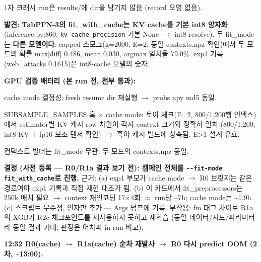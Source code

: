\par\noindent \textbullet\enspace 1차 크래시 run은 results/\allowbreak{}에 dir을 남기지 않음 (record 오염 없음).


\textbf{발견: TabPFN-3의 fit\_\allowbreak{}with\_\allowbreak{}cache는 KV cache를 기본 int8 양자화} (inference.py:860, \texttt{kv\_\allowbreak{}\allowbreak{}cache\allowbreak{}\_\allowbreak{}\allowbreak{}precisi\allowbreak{}on} 기본 None  \ensuremath{\rightarrow}  int8 resolve). 두 fit\_\allowbreak{}mode는 \textbf{다른 모델이다}: capped 스모크(k=\allowbreak{}2000, E=\allowbreak{}2, 동일 contexts.npz 확인)에서 두 모드의 확률 max|diff| 0.486, mean 0.030, argmax 일치율 79.0\%. exp1 기록(web\_\allowbreak{}attacks 0.1615)은 int8-cache 모델의 숫자.

\textbf{GPU 검증 배터리 (본 run 전, 전부 통과):}

\par\noindent \textbullet\enspace cache mode 결정성: fresh resume dir 재실행  \ensuremath{\rightarrow}  probs npy md5 동일.


\par\noindent \textbullet\enspace SUBSAMPLE\_\allowbreak{}SAMPLES 훅 × cache mode: 토이 체크(E=\allowbreak{}2, 800/\allowbreak{}1,200행 인덱스)에서 estimator별 KV 캐시 row 차원이 각자 context 크기와 정확히 일치 (800/\allowbreak{}1,200; int8 KV +\allowbreak{} fp16 보조 텐서 확인)  \ensuremath{\rightarrow}  훅이 캐시 빌드에 상속됨. E>1 설계 유효.


\par\noindent \textbullet\enspace 컨텍스트 빌더는 fit\_\allowbreak{}mode 무관: 두 모드의 contexts.npz 동일.


\textbf{결정 (사전 등록 — R0/\allowbreak{}R1a 결과 보기 전): 캠페인 전체를 \texttt{-\allowbreak{}-\allowbreak{}fit-\allowbreak{}mo\allowbreak{}de fit\_\allowbreak{}\allowbreak{}w\allowbreak{}ith\_\allowbreak{}\allowbreak{}cach\allowbreak{}e}로 진행.} 근거: (a) exp1 부모가 cache mode  \ensuremath{\rightarrow}  R0 브릿지는 같은 경로여야 exp1 기록과 직접 재현 대조가 됨. (b) 이 카드에서 fit\_\allowbreak{}preprocessors는 250k 배치 필요  \ensuremath{\rightarrow}  context 재인코딩 17×4회 \ensuremath{\approx} run당 \textasciitilde{}7h; cache mode는 \textasciitilde{}1.9h. (c) 스크립트 무수정, 인자만 추가 — Args 덤프에 기록. 부작용: fm 태그 차이로 R1a의 XGB가 R2c 체크포인트를 재사용하지 못하고 재학습 (동일 데이터/\allowbreak{}시드/\allowbreak{}파라미터라 동일 결과 기대; 판정은 어차피 in-run 비교).

\textbf{12:32 R0(cache)  \ensuremath{\rightarrow}  R1a(cache) 순차 재발사  \ensuremath{\rightarrow}  R0 다시 predict OOM (2차, \textasciitilde{}13:00).}

